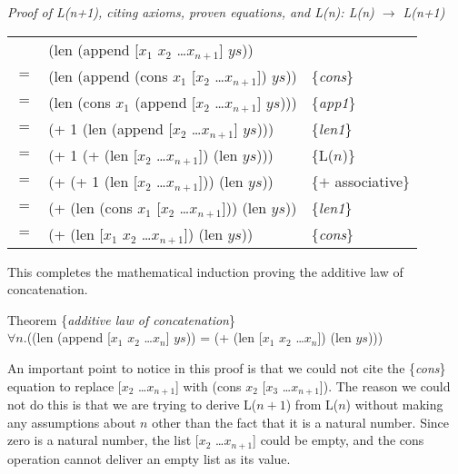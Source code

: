 \begin{center}
\emph{Proof of L(n+1), citing axioms, proven equations, and L(n): L(n) $\rightarrow$ L(n+1)}\\
\begin{tabular}{lll}
    & (len (append [$x_1$ $x_2$ \dots $x_{n+1}$] $ys$))         &                     \\
$=$ & (len (append (cons $x_1$ [$x_2$ \dots $x_{n+1}$]) $ys$))  & \{\emph{cons}\}     \\
$=$ & (len (cons $x_1$ (append [$x_2$ \dots $x_{n+1}$] $ys$)))  & \{\emph{app1}\}     \\
$=$ & (+ 1 (len (append [$x_2$ \dots $x_{n+1}$] $ys$)))         & \{\emph{len1}\}     \\
$=$ & (+ 1 (+ (len [$x_2$ \dots $x_{n+1}$]) (len $ys$)))        & \{L($n$)\}          \\
$=$ & (+ (+ 1 (len [$x_2$ \dots $x_{n+1}$])) (len $ys$))        & \{$+$ associative\} \\
$=$ & (+ (len (cons $x_1$ [$x_2$ \dots $x_{n+1}$])) (len $ys$)) & \{\emph{len1}\}     \\
$=$ & (+ (len [$x_1$ $x_2$ \dots $x_{n+1}$]) (len $ys$))        & \{\emph{cons}\}     \\
\end{tabular}
\end{center}

This completes the mathematical induction proving the
additive law of concatenation.
\begin{samepage}
\begin{center}
\label{additive-law-concatenation}
Theorem \{\emph{additive law of concatenation}\} \\
$\forall$$n$.((len (append [$x_1$ $x_2$ \dots $x_n$] $ys$))
= (+ (len [$x_1$ $x_2$ \dots $x_n$]) (len $ys$)))
\end{center}
\end{samepage}

An important point to notice in this proof is that
we could not cite the \{\emph{cons}\} equation to replace [$x_2$ \dots $x_{n+1}$]
with (cons $x_2$ [$x_3$ \dots $x_{n+1}$]).
The reason we could not do this is that we are trying to derive
L($n+1$) from L($n$) without making any assumptions about $n$
other than the fact that it is a natural number.
Since zero is a natural number, the list [$x_2$ \dots $x_{n+1}$]
could be empty, and the cons operation cannot deliver an empty list as its value.

